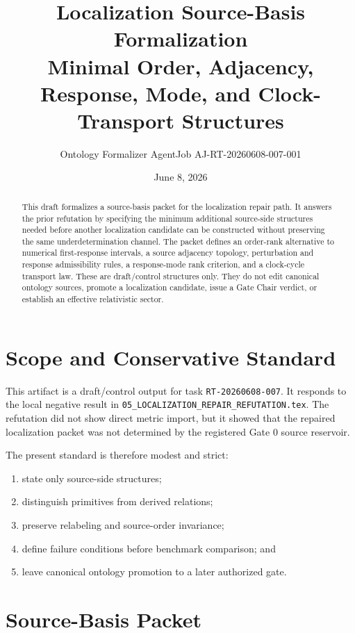 \documentclass[11pt]{article}
\title{\textbf{Localization Source-Basis Formalization}\\[0.35em]
\large Minimal Order, Adjacency, Response, Mode, and Clock-Transport Structures}
\author{Ontology Formalizer AgentJob AJ-RT-20260608-007-001}
\date{June 8, 2026}
\begin{document}
\maketitle

\begin{abstract}
This draft formalizes a source-basis packet for the localization repair path.
It answers the prior refutation by specifying the minimum additional
source-side structures needed before another localization candidate can be
constructed without preserving the same underdetermination channel. The packet
defines an order-rank alternative to numerical first-response intervals, a
source adjacency topology, perturbation and response admissibility rules, a
response-mode rank criterion, and a clock-cycle transport law. These are
draft/control structures only. They do not edit canonical ontology sources,
promote a localization candidate, issue a Gate Chair verdict, or establish an
effective relativistic sector.
\end{abstract}

\section{Scope and Conservative Standard}

This artifact is a draft/control output for task
\texttt{RT-20260608-007}. It responds to the local negative result in
\texttt{05\_LOCALIZATION\_REPAIR\_REFUTATION.tex}. The refutation did not show
direct metric import, but it showed that the repaired localization packet was
not determined by the registered Gate 0 source reservoir.

The present standard is therefore modest and strict:
\begin{enumerate}
    \item state only source-side structures;
    \item distinguish primitives from derived relations;
    \item preserve relabeling and source-order invariance;
    \item define failure conditions before benchmark comparison; and
    \item leave canonical ontology promotion to a later authorized gate.
\end{enumerate}

\section{Source-Basis Packet}
\end{document}
